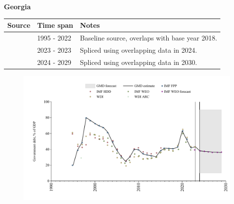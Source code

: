 \documentclass[12pt,a4paper,landscape]{article}
\begin{document}
\begin{adjustbox}{max totalsize={\paperwidth}{\paperheight},center}
\begin{minipage}[t][\textheight][t]{\textwidth}
\vspace*{0.5cm}
{}
\begin{center}
{\Large\bfseries Georgia}
\end{center}
\vspace{0.5cm}
\begin{table}[H]
\centering
\small
\begin{tabular}{|l|l|l|}
\hline
\textbf{Source} & \textbf{Time span} & \textbf{Notes} \\
\hline
\rowcolor{white}\cite{IMF_FPP}& 1995 - 2022 &Baseline source, overlaps with base year 2018.\\
\rowcolor{lightgray}\cite{WDI}& 2023 - 2023 &Spliced using overlapping data in 2024.\\
\rowcolor{white}\cite{IMF_WEO_forecast}& 2024 - 2029 &Spliced using overlapping data in 2030.\\
\hline
\end{tabular}
\end{table}
\begin{figure}[H]
\centering
\includegraphics[width=\textwidth,height=0.6\textheight,keepaspectratio]{graphs/GEO_govdebt_GDP.pdf}
\end{figure}
\end{minipage}
\end{adjustbox}
\end{document}
